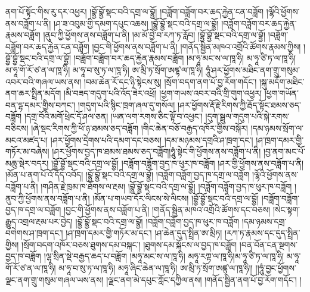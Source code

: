 ནག་པོ་སྟོང་གིས་རུ་དར་འཕྱར། །བྷྱོ་བྷྱོ་སྡང་བའི་དགྲ་ལ་བྷྱོ། །བཟློག་བཟློག་བར་ཆད་རྐྱེན་ངན་བཟློག །ལྷོའི་ཕྱོགས་ནས་བཟློག་པ་ནི། །ཤ་ཟ་འབུམ་གྱི་དམག་དཔུང་འཆས། །བྷྱོ་བྷྱོ་སྡང་བའི་དགྲ་ལ་བྷྱོ། །བཟློག་བཟློག་བར་ཆད་རྐྱེན་རྣམས་བཟློག །ནུབ་ཀྱི་ཕྱོགས་ནས་བཟློག་པ་ནི། །མ་མོ་བྱེ་བ་རཀ་ཏ་རློབ། །བྷྱོ་བྷྱོ་སྡང་བའི་དགྲ་ལ་བྷྱོ། །བཟློག་བཟློག་བར་ཆད་རྐྱེན་ངན་བཟློག །བྱང་གི་ཕྱོགས་ནས་བཟློག་པ་ནི། །གནོད་སྦྱིན་མཁའ་འགྲོའི་ཚོགས་རྣམས་ཀྱིས། །བྷྱོ་བྷྱོ་སྡང་བའི་དགྲ་ལ་བྷྱོ། །བཟློག་བཟློག་བར་ཆད་རྐྱེན་རྣམས་བཟློག །མ་ཧཱ་མང་ས་ལ་ཁཱ་ཧི། མ་ཧཱ་ཙི་ཏ་ལ་ཁཱ་ཧི། མ་ཧཱ་གོ་རོ་ཙ་ན་ལ་ཁཱ་ཧི། མ་ཧཱ་བ་སུ་ཏ་ལ་ཁཱ་ཧི། ཨ་མྲི་ཏ་སྲོག་ཨཛྷ་ལ་ཁཱ་ཧི། ཧཱུཾ་ཤར་ཕྱོགས་མཐིང་ནག་གྲུ་གསུམ་འབར་བའི་གཞལ་ཡས་ནས། །བམ་ཆེན་རོ་དང་ཉི་སྟེངས་སུ། །སྲོག་བདག་ནག་པོ་བྱ་རོག་གདོང་། །སྐུ་མདོག་མཐིང་ནག་ཆར་སྤྲིན་མདོག །མི་བཟད་གདུག་པའི་འོད་ཟེར་འཕྲོ། །ཕྱག་གཡས་འབར་བའི་གྲི་གུག་འཕྱར། །ཕྱག་གཡོན་བན་དྷ་དམར་གྱིས་བཀང་། །གདུག་པའི་སྙིང་ཁྲག་ཞལ་དུ་གསོལ། །ཤར་ཕྱོགས་རྡོ་རྗེ་རིགས་ཀྱི་རྦོད་སྟོང་ཐམས་ཅད་བཟློག །དགྲ་བོའི་མགོ་ཕྲེང་དོ་ཤལ་ཅན། །ཡན་ལག་རགས་ཅིང་ལྟོ་བ་འཕྱང་། །དུག་སྦྲུལ་གདུག་པའི་སྐེ་རགས་བཅིངས། །ཞེ་སྡང་རིགས་ཀྱི་ཕོ་ཉ་ཐམས་ཅད་བཟློག །གིང་ཆེན་བཅོ་བརྒྱད་འཁོར་གྱིས་བསྐོར། །དམ་ཉམས་སྲོག་ལ་མངའ་མཛད་པ། །ཤར་ཕྱོགས་དྲེགས་པའི་དམག་དང་བཅས། །དམ་མཉམས་དགྲའི་ཤ་ཁྲག་དང་། །ཤ་ཁྲག་དམར་གྱི་གཏོར་མ་བཞེས། །ཤར་ཕྱོགས་བྱད་ཁ་ཐམས་ཐམས་ཅད་བཟློག།ཧཱུཾ་སྟེང་གི་ཕྱོགས་ནས་བཟློག་པ་ནི། །བྱ་ནག་མང་པོ་མཆུ་སྡེར་བདར། །བྷྱོ་བྷྱོ་སྡང་བའི་དགྲ་ལ་བྷྱོ། །བཟློག་བཟློག་བྱད་ཁ་ཕུར་ཁ་བཟློག །ཤར་གྱི་ཕྱོགས་ནས་བཟློག་པ་ནི། །མོན་པ་ནག་པོ་འོ་དོད་འབོད། །བྷྱོ་བྷྱོ་སྡང་བའི་དགྲ་ལ་བྷྱོ། །བཟློག་བཟློག་བྱད་ཁ་དགྲ་ལ་བཟློག །ལྷོའི་ཕྱོགས་ནས་བཟློག་པ་ནི། །གཤིན་རྗེ་ཁྲམ་ཁ་ཐོགས་ལ་རྔམ། །བྷྱོ་བྷྱོ་སྡང་བའི་དགྲ་ལ་བྷྱོ། །བཟློག་བཟློག་བྱད་ཁ་ཕུར་ཁ་བཟློག །ནུབ་ཀྱི་ཕྱོགས་ནས་བཟློག་པ་ནི། །མོན་པ་གཡབ་དོར་ལིངས་སེ་ལིངས། །བྷྱོ་བྷྱོ་སྡང་བའི་དགྲ་ལ་བྷྱོ། །བཟློག་བཟློག་བྱད་ཁ་དགྲ་ལ་བཟློག །བྱང་གི་ཕྱོགས་ནས་བཟློག་པ་ནི། །གནོད་སྦྱིན་མཁའ་འགྲོའི་ཚོགས་དང་བཅས། །སེང་སྟག་རྒྱུད་འགྲལ་རྔམ་པར་བྱེད། །བྷྱོ་བྷྱོ་སྡང་བའི་དགྲ་ལ་བྷྱོ། །བཟློག་བཟློག་བྱད་ཁ་ཕུར་ཁ་བཟློག །དམ་ཉམས་དགྲ་བགེགས་ཤ་ཁྲག་དང་། །ཤ་ཁྲག་དམར་གྱི་གཏོར་མ་དང་། །ཤ་ཆེན་དུད་སྤྲིན་ཨ་མྲིཏ། །རཀ་ཏ་རྣམས་དང་དུད་སྤྲིན་གྱིས། །སྲོག་བདག་འཁོར་བཅས་ཐུགས་དམ་བསྐང་། །ཐུགས་དམ་སྐོངས་ལ་བྱད་ཁ་བཟློག །བན་བོན་ངན་སྔགས་བྱད་ཁ་བཟློག །ལྷ་སྲིན་སྡེ་བརྒྱད་ཆད་པ་བཟློག །མཧཱ་མང་ས་ལ་ཁཱ་ཧི། མཧཱ་རཀྟ་ལ་ཁཱ་ཧི།མ་ཧཱ་ཙི་ཏ་ལ་ཁཱ་ཧི། མ་ཧཱ་གོ་རོ་ཙ་ན་ལ་ཁཱ་ཧི། མ་ཧཱ་བ་སུ་ཏ་ལ་ཁཱ་ཧི། མཧཱ་ཞིང་ཆེན་ལ་ཁཱ་ཧི། ཨ་མྲི་ཏ་སྲོག་ཨཛྙ་ལ་ཁཱ་ཧི།། །།ཧཱུཾ་བྱང་ཕྱོགས་ལྗང་ནག་གྲུ་གསུམ་གཞལ་ཡས་ནས། །ལྗང་ནག་མེ་དཔུང་ཀློང་དཀྱིལ་ནས། །གནོད་སྦྱིན་ནག་པོ་བྱ་རོག་གདོང་། །
